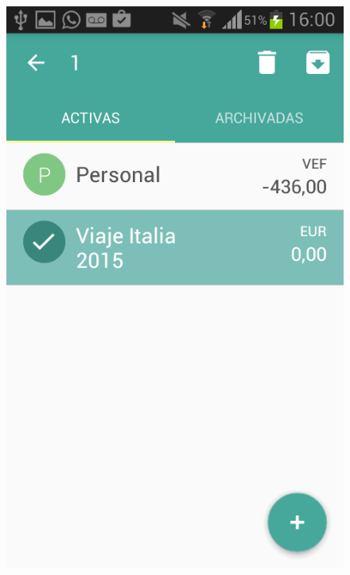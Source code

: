 \begin{figure}[ht]
\begin{minipage}{.5\textwidth}
  \includegraphics[scale=0.30,type=png,ext=.png,read=.png]{imagenes/Screenshots/select_accounts}
  \captionsetup{justification=centering}
  \label{fig:interfazEliminarCuentas}
\end{minipage}
\end{figure}

